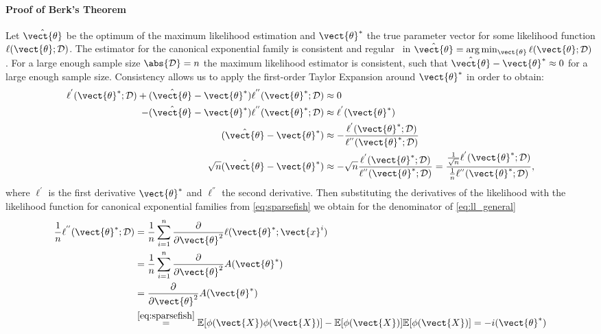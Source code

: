         \paragraph*{Proof of Berk's Theorem}
        Let $\hat{\vect{\theta}}$ be the optimum of the maximum likelihood estimation and $\vect{\theta}^*$ the true parameter vector for some likelihood function $\ell(\vect{\theta}; \mathcal{D})$.
        The estimator for the canonical exponential family is consistent and regular~\cite{berk1972consistency}  in  $\hat{\vect{\theta}} = \arg\min_{\vect{\theta}} \ell(\vect{\theta}; \mathcal{D})$.
        For a large enough sample size $\abs{\mathcal{D}} = n$ the maximum likelihood estimator  is consistent, such that $\hat{\vect{\theta}} - \vect{\theta}^* \approx 0$ for a large enough sample size. 
        Consistency allows us to apply the first-order Taylor Expansion around $\vect{\theta}^*$ in order to obtain:
        \begin{equation}
            \label{eq:ll_general}
            \begin{split}
                 \ell^{'}(\vect{\theta}^*; \mathcal{D}) +(\hat{\vect{\theta}} - \vect{\theta}^*) \ell^{''}(\vect{\theta}^*; \mathcal{D}) &\approx 0 \\
            - (\hat{\vect{\theta}} - \vect{\theta}^*) \ell^{''}(\vect{\theta}^*; \mathcal{D})&  \approx \ell^{'}(\vect{\theta}^*) \\
            (\hat{\vect{\theta}} - \vect{\theta}^*)  &\approx - \frac{ \ell^{'}(\vect{\theta}^*; \mathcal{D}) }{ \ell^{''}(\vect{\theta}^*; \mathcal{D})} \\
            \sqrt{n}(\hat{\vect{\theta}} - \vect{\theta}^*)  &\approx - \sqrt{n} \frac{ \ell^{'}(\vect{\theta}^*; \mathcal{D}) }{ \ell^{''}(\vect{\theta}^*; \mathcal{D})} =  \frac{\frac{1}{\sqrt{n}} \ell^{'}(\vect{\theta}^*; \mathcal{D}) }{ \frac{1}{n}\ell^{''}(\vect{\theta}^*; \mathcal{D})}, \\
            \end{split}
        \end{equation}
        where $\ell^{'}$ is the first derivative \wrt $\vect{\theta}^*$ and $\ell^{''}$ the second derivative.
      Then substituting the derivatives of the likelihood with the likelihood function for canonical exponential families from \autoref{eq:sparsefish} we obtain for the denominator of \autoref{eq:ll_general}
      \begin{equation}
        \begin{split}
        \frac{1}{n}\ell^{''}(\vect{\theta}^*; \mathcal{D}) &= \frac{1}{n} \sum_{i=1}^n \frac{\partial}{\partial \vect{\theta}^2} \ell (\vect{\theta}^*; \vect{x}^i)\\
        &= \frac{1}{n} \sum_{i=1}^n \frac{\partial}{\partial \vect{\theta}^2} A(\vect{\theta}^*)\\
        & = \frac{\partial}{\partial \vect{\theta}^2}  A(\vect{\theta}^*)  \\
        &\stackrel{\ref{eq:sparsefish}}{=} \mathbb{E}[\phi(\vect{X}) \phi(\vect{X})] - \mathbb{E}[\phi(\vect{X})] \mathbb{E}[\phi(\vect{X})] = - i(\vect{\theta}^*)
        \end{split}
      \end{equation}

